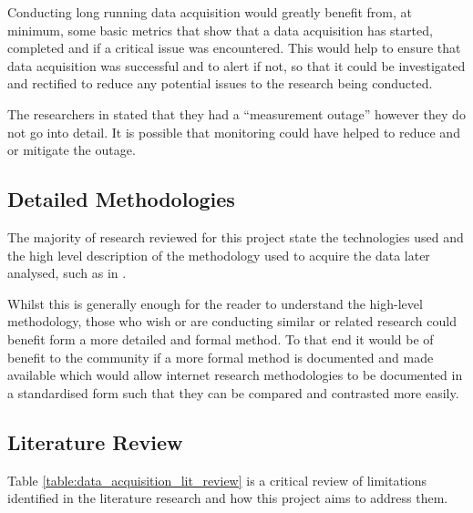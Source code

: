\documentclass{mscreport}
\begin{document}
Conducting long running data acquisition would greatly benefit from, at minimum, some basic metrics that show that a data acquisition has started, completed and if a critical issue was encountered. This would help to ensure that data acquisition was successful and to alert if not, so that it could be investigated and rectified to reduce any potential issues to the research being conducted.

\vspace{0.3cm} \noindent
The researchers in \cite{Poteat2021-zr} stated that they had a ``measurement outage'' however they do not go into detail. It is possible that monitoring could have helped to reduce and or mitigate the outage.

\subsection{Detailed Methodologies}

The majority of research reviewed for this project state the technologies used and the high level description of the methodology used to acquire the data later analysed, such as in \cite{Amann2017-co,Chen2016-dl,Van_Goethem2014-ao}.

\vspace{0.3cm} \noindent
Whilst this is generally enough for the reader to understand the high-level methodology, those who wish or are conducting similar or related research could benefit form a more detailed and formal method. To that end it would be of benefit to the community if a more formal method is documented and made available which would allow internet research methodologies to be documented in a standardised form such that they can be compared and contrasted more easily.

\subsection{Literature Review}

Table \ref{table:data_acquisition_lit_review} is a critical review of limitations identified in the literature research and how this project aims to address them.
\end{document}
